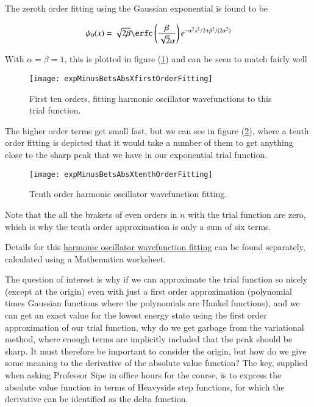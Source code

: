 The zeroth order fitting using the Gaussian exponential is found to be

\begin{equation}\label{eqn:variationHarmonicOscillator:310}
\psi_0(x) = \sqrt{2 \beta} 
\erfc\left(\frac{\beta }{\sqrt{2} \alpha }\right)
e^{- \alpha^2 x^2/2 +\beta^2/(2 \alpha^2)} 
\end{equation}

With $\alpha = \beta = 1$, this is plotted in figure (\ref{fig:expMinusBetsAbsXfirstOrderFitting}) and can be seen to match fairly well

\begin{figure}[htp]
\centering
\texttt{[image: expMinusBetsAbsXfirstOrderFitting]}
\caption{First ten orders, fitting harmonic oscillator wavefunctions to this trial function.}\label{fig:expMinusBetsAbsXfirstOrderFitting}
\end{figure}

The higher order terms get small fast, but we can see in figure (\ref{fig:expMinusBetsAbsXtenthOrderFitting}), where a tenth order fitting is depicted that it would take a number of them to get anything close to the sharp peak that we have in our exponential trial function.

\begin{figure}[htp]
\centering
\texttt{[image: expMinusBetsAbsXtenthOrderFitting]}
\caption{Tenth order harmonic oscillator wavefunction fitting.}\label{fig:expMinusBetsAbsXtenthOrderFitting}
\end{figure}

Note that the all the brakets of even orders in $n$ with the trial function are zero, which is why the tenth order approximation is only a sum of six terms.

Details for this \href{https://github.com/peeterjoot/physicsplay/blob/master/notes/phy456/gaussian\%20fitting\%20for\%20abs\%20function.nb}{harmonic oscillator wavefunction fitting} can be found separately, calculated using a Mathematica worksheet.

The question of interest is why if we can approximate the trial function so nicely (except at the origin) even with just a first order approximation (polynomial times Gaussian functions where the polynomials are Hankel functions), and we can get an exact value for the lowest energy state using the first order approximation of our trial function, why do we get garbage from the variational method, where enough terms are implicitly included that the peak should be sharp.  It must therefore be important to consider the origin, but how do we give some meaning to the derivative of the absolute value function?  The key, supplied when asking Professor Sipe in office hours for the course, is to express the absolute value function in terms of Heavyside step functions, for which the derivative can be identified as the delta function.


